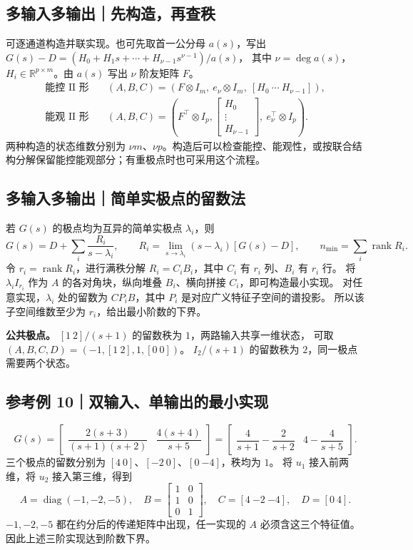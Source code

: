 \documentclass[UTF8,a4paper,12pt,fontset=fandol]{ctexart}
\DeclareMathOperator{\rank}{rank}
\begin{document}
\subsection*{多输入多输出｜先构造，再查秩}
可逐通道构造并联实现。也可先取首一公分母 $a(s)$，写出
$G(s)-D=(H_0+H_1s+\cdots+H_{\nu-1}s^{\nu-1})/a(s)$，
其中 $\nu=\deg a(s)$，$H_i\in\mathbb R^{p\times m}$。由 $a(s)$ 写出 $\nu$ 阶友矩阵 $F$。
\[
\begin{aligned}
 \text{能控 II 形}\quad &(A,B,C)=(F\otimes I_m,\ e_\nu\otimes I_m,\ [H_0\ \cdots\ H_{\nu-1}]),\\
 \text{能观 II 形}\quad &(A,B,C)=\left(F^\top\otimes I_p,
       \begin{bmatrix} H_0\\ \vdots\\ H_{\nu-1}\end{bmatrix},\ e_\nu^\top\otimes I_p\right).
\end{aligned}
\]
两种构造的状态维数分别为 $\nu m$、$\nu p$。构造后可以检查能控、能观性，或按联合结构分解保留能控能观部分；有重极点时也可采用这个流程。

\newpage
\subsection*{多输入多输出｜简单实极点的留数法}

若 $G(s)$ 的极点均为互异的简单实极点 $\lambda_i$，则
\[
 G(s)=D+\sum_i\frac{R_i}{s-\lambda_i},\qquad
 R_i=\lim_{s\to\lambda_i}(s-\lambda_i)[G(s)-D],\qquad
 \boxed{n_{\min}=\sum_i\rank R_i.}
\]
令 $r_i=\rank R_i$，进行满秩分解 $R_i=C_i B_i$，其中 $C_i$ 有 $r_i$ 列、$B_i$ 有 $r_i$ 行。
将 $\lambda_i I_{r_i}$ 作为 $A$ 的各对角块，纵向堆叠 $B_i$、横向拼接 $C_i$，即可构造最小实现。
对任意实现，$\lambda_i$ 处的留数为 $CP_iB$，其中 $P_i$ 是对应广义特征子空间的谱投影。
所以该子空间维数至少为 $r_i$，给出最小阶数的下界。

\textbf{公共极点。}
$[1\ 2]/(s+1)$ 的留数秩为 $1$，两路输入共享一维状态，
可取 $(A,B,C,D)=(-1,[1\ 2],1,[0\ 0])$。
$I_2/(s+1)$ 的留数秩为 $2$，同一极点需要两个状态。

\subsection*{参考例 10｜双输入、单输出的最小实现}
\[
 G(s)=\begin{bmatrix}\dfrac{2(s+3)}{(s+1)(s+2)}&
                      \dfrac{4(s+4)}{s+5}\end{bmatrix}
     =\begin{bmatrix}\dfrac{4}{s+1}-\dfrac{2}{s+2}&
                       4-\dfrac{4}{s+5}\end{bmatrix}.
\]
三个极点的留数分别为 $[4\ 0]$、$[-2\ 0]$、$[0\ {-4}]$，秩均为 $1$。
将 $u_1$ 接入前两维，将 $u_2$ 接入第三维，得到
\[
 A=\operatorname{diag}(-1,-2,-5),\quad
 B=\begin{bmatrix}1&0\\1&0\\0&1\end{bmatrix},\quad
 C=[4\ {-2}\ {-4}],\quad D=[0\ 4].
\]
$-1,-2,-5$ 都在约分后的传递矩阵中出现，任一实现的 $A$ 必须含这三个特征值。
因此上述三阶实现达到阶数下界。
\newpage
\end{document}
